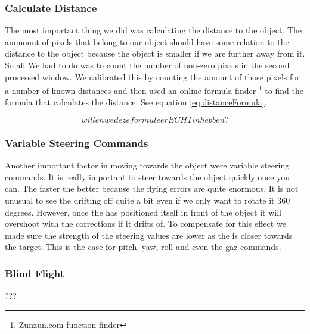 \subsubsection{Calculate Distance}
The most important thing we did was calculating the distance to the object. The ammount of pixels that belong to our 
object should have some relation to the distance to the object because the object is smaller if we are further away
from it. So all We had to do was to count the number of non-zero pixels in the second processed
window. 
We calibrated this by counting the amount of those pixels for a number of known distances and
then used an online formula finder \footnote{\href{http://zunzun.com/FunctionFinder/2/}{Zunzun.com function finder}} to find the formula 
that calculates the distance. See equation \ref{eq:distanceFormula}.

\begin{equation}
willen we deze formule er ECHT in hebben?
\label{eq:distanceFormula}
\end{equation}

\subsubsection{Variable Steering Commands}
Another important factor in moving towards the object were variable steering commands. 
It is really important to steer towards the object quickly once you can. The faster the 
better because the flying errors are quite enormous. It is not unusual to see the \Ardrone
drifting off quite a bit even if we only want to rotate it 360 degrees. However, once
the \Ardrone has positioned itself in front of the object it will overshoot with the
corrections if it drifts of. To compensate for this effect we made sure the strength
of the steering values are lower as the \Ardrone is closer towards the target. This
is the case for pitch, yaw, roll and even the gaz commands. 

\subsubsection{Blind Flight}
???


\label{sec:pickingUp}

























